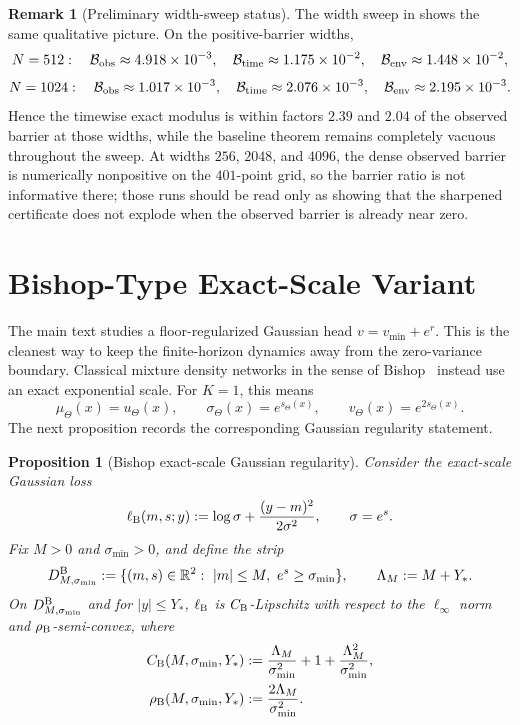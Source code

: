 \documentclass[11pt]{article}
\newtheorem{proposition}[theorem]{Proposition}
\theoremstyle{definition}
\newtheorem{remark}[theorem]{Remark}
\newcommand{\R}{\mathbb{R}}
\newcommand{\abs}[1]{\left\lvert #1 \right\rvert}
\newcommand{\cB}{\mathcal{B}}
\begin{document}
\begin{remark}[Preliminary width-sweep status]
\label{rem:gaussian-width-sweep}
The width sweep in
shows the same qualitative picture. On the positive-barrier widths,
\[
  N=512:
  \quad
  \cB_{\rm obs}\approx 4.918\times 10^{-3},
  \quad
  \cB_{\rm time}\approx 1.175\times 10^{-2},
  \quad
  \cB_{\rm env}\approx 1.448\times 10^{-2},
\]
\[
  N=1024:
  \quad
  \cB_{\rm obs}\approx 1.017\times 10^{-3},
  \quad
  \cB_{\rm time}\approx 2.076\times 10^{-3},
  \quad
  \cB_{\rm env}\approx 2.195\times 10^{-3}.
\]
Hence the timewise exact modulus is within factors $2.39$ and $2.04$ of the
observed barrier at those widths, while the baseline theorem remains
completely vacuous throughout the sweep. At widths $256$, $2048$, and $4096$,
the dense observed barrier is numerically nonpositive on the $401$-point grid,
so the barrier ratio is not informative there; those runs should be read only
as showing that the sharpened certificate does not explode when the observed
barrier is already near zero.
\end{remark}

\section{Bishop-Type Exact-Scale Variant}
\label{sec:bishop}

The main text studies a floor-regularized Gaussian head
$v=v_{\min}+e^r$. This is the cleanest way to keep the finite-horizon dynamics
away from the zero-variance boundary. Classical mixture density networks in the
sense of Bishop~\cite{Bishop1994} instead use an exact exponential scale. For
$K=1$, this means
\[
  \mu_\Theta(x)=u_\Theta(x),
  \qquad
  \sigma_\Theta(x)=e^{s_\Theta(x)},
  \qquad
  v_\Theta(x)=e^{2s_\Theta(x)}.
\]
The next proposition records the corresponding Gaussian regularity statement.

\begin{proposition}[Bishop exact-scale Gaussian regularity]
\label{prop:bishop-regularity}
Consider the exact-scale Gaussian loss
\begin{equation}
  \ell_{\rm B}(m,s;y)
  :=
  \log \sigma
  +
  \frac{(y-m)^2}{2\sigma^2},
  \qquad
  \sigma=e^s.
  \label{eq:bishop-loss}
\end{equation}
Fix $M>0$ and $\sigma_{\min}>0$, and define the strip
\[
  D_{M,\sigma_{\min}}^{\rm B}
  :=
  \{(m,s)\in\R^2:\ \abs{m}\le M,\ e^s\ge \sigma_{\min}\},
  \qquad
  \Lambda_M:=M+Y_\ast.
\]
On $D_{M,\sigma_{\min}}^{\rm B}$ and for $\abs{y}\le Y_\ast$,
$\ell_{\rm B}$ is $C_{\rm B}$-Lipschitz with respect to the $\ell_\infty$
norm and $\rho_{\rm B}$-semi-convex, where
\begin{align}
  C_{\rm B}(M,\sigma_{\min},Y_\ast)
  &:=
  \frac{\Lambda_M}{\sigma_{\min}^2}
  +
  1
  +
  \frac{\Lambda_M^2}{\sigma_{\min}^2},
  \label{eq:CB}
  \\
  \rho_{\rm B}(M,\sigma_{\min},Y_\ast)
  &:=
  \frac{2\Lambda_M}{\sigma_{\min}^2}.
  \label{eq:rhoB}
\end{align}
\end{proposition}
\end{document}
